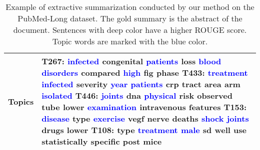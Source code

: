 \documentclass[11pt]{article}
\begin{document}
\begin{table}[!hbt]
{\begin{tabular}{|p{0.1\linewidth}|p{0.9\linewidth}|}
\textbf{Topics}& T267: \textcolor{blue}{infected} congenital \textcolor{blue}{patients} loss \textcolor{blue}{blood} \textcolor{blue}{disorders} compared \textcolor{blue}{high} fig phase 
T433: \textcolor{blue}{treatment} \textcolor{blue}{infected} severity \textcolor{blue}{year} \textcolor{blue}{patients} crp tract area arm \textcolor{blue}{isolated} 
T446: \textcolor{blue}{joints} dna \textcolor{blue}{physical} risk observed tube lower \textcolor{blue}{examination} intravenous features
T153: \textcolor{blue}{disease} type \textcolor{blue}{exercise} vegf nerve deaths \textcolor{blue}{shock} \textcolor{blue}{joints} drugs lower
T108: type \textcolor{blue}{treatment} \textcolor{blue}{male} sd well use statistically specific post mice\\
\hline
    \end{tabular}}
    \caption{Example of extractive summarization conducted by our method on the PubMed-Long dataset. The gold summary is the abstract of the document. Sentences with deep color have a higher ROUGE score. Topic words are marked with the blue color.}
    \label{tab:case}
\end{table}
\end{document}
